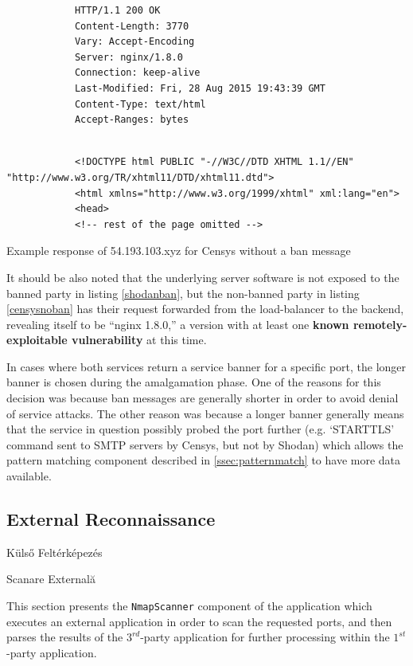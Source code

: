 \documentclass[a4paper,12pt]{article}
\newcommand\subsectionhu[1]{\addcontentsline{toc.hu}{subsection} {\protect\numberline{\thesubsection} #1}}
\newcommand\subsectionro[1]{\addcontentsline{toc.ro}{subsection} {\protect\numberline{\thesubsection} #1}}
\begin{document}
	\begin{listing}[H]
		\begin{verbatim}
			HTTP/1.1 200 OK
			Content-Length: 3770
			Vary: Accept-Encoding
			Server: nginx/1.8.0
			Connection: keep-alive
			Last-Modified: Fri, 28 Aug 2015 19:43:39 GMT
			Content-Type: text/html
			Accept-Ranges: bytes
		\end{verbatim}
		\vspace{-5pt}
		\begin{verbatim}
			 
			<!DOCTYPE html PUBLIC "-//W3C//DTD XHTML 1.1//EN" "http://www.w3.org/TR/xhtml11/DTD/xhtml11.dtd">
			<html xmlns="http://www.w3.org/1999/xhtml" xml:lang="en">
			<head>
			<!-- rest of the page omitted -->
		\end{verbatim}
		\caption{Example response of 54.193.103.xyz for Censys without a ban message}
		\label{censysnoban}
	\end{listing}

	It should be also noted that the underlying server software is not exposed to the banned party in listing \ref{shodanban}, but the non-banned party in listing \ref{censysnoban} has their request forwarded from the load-balancer to the backend, revealing itself to be ``nginx 1.8.0,'' a version with at least one \textbf{known remotely-exploitable vulnerability}\cite{nginxcve} at this time.

	In cases where both services return a service banner for a specific port, the longer banner is chosen during the amalgamation phase. One of the reasons for this decision was because ban messages are generally shorter\cite{qualys11} in order to avoid denial of service attacks. The other reason was because a longer banner generally means that the service in question possibly probed the port further (e.g. `STARTTLS' command sent to SMTP servers by Censys, but not by Shodan) which allows the pattern matching component described in \ref{ssec:patternmatch} to have more data available.

\subsection{External Reconnaissance} \label{ssec:nmapscan}
\subsectionhu{Külső Feltérképezés} \subsectionro{Scanare Externală}

	This section presents the \texttt{NmapScanner} component of the application which executes an external application in order to scan the requested ports, and then parses the results of the $3^{rd}$-party application for further processing within the $1^{st}$-party application.
	
\end{document}
